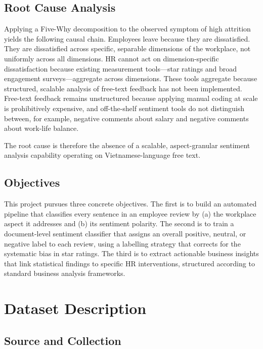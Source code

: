 \documentclass[12pt, a4paper]{article}
\begin{document}
\subsection{Root Cause Analysis}

Applying a Five-Why decomposition to the observed symptom of high attrition yields the following causal chain. Employees leave because they are dissatisfied. They are dissatisfied across specific, separable dimensions of the workplace, not uniformly across all dimensions. HR cannot act on dimension-specific dissatisfaction because existing measurement tools---star ratings and broad engagement surveys---aggregate across dimensions. These tools aggregate because structured, scalable analysis of free-text feedback has not been implemented. Free-text feedback remains unstructured because applying manual coding at scale is prohibitively expensive, and off-the-shelf sentiment tools do not distinguish between, for example, negative comments about salary and negative comments about work-life balance.

The root cause is therefore the absence of a scalable, aspect-granular sentiment analysis capability operating on Vietnamese-language free text.

\subsection{Objectives}

This project pursues three concrete objectives. The first is to build an automated pipeline that classifies every sentence in an employee review by (a) the workplace aspect it addresses and (b) its sentiment polarity. The second is to train a document-level sentiment classifier that assigns an overall positive, neutral, or negative label to each review, using a labelling strategy that corrects for the systematic bias in star ratings. The third is to extract actionable business insights that link statistical findings to specific HR interventions, structured according to standard business analysis frameworks.

\section{Dataset Description}

\subsection{Source and Collection}
\end{document}

